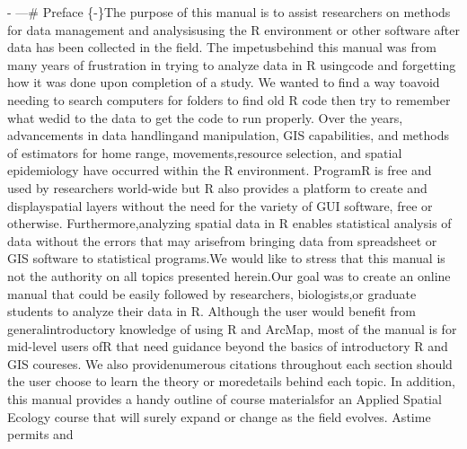 \documentclass[
  letterpaper,
  DIV=11,
  numbers=noendperiod]{scrreprt}
\begin{document}
- \posttitle{\end{center}}---\mainmatter\# Preface \{-\}The purpose of
this manual is to assist researchers on methods for data management and
analysisusing the R environment or other software after data has been
collected in the field. The impetusbehind this manual was from many
years of frustration in trying to analyze data in R usingcode and
forgetting how it was done upon completion of a study. We wanted to find
a way toavoid needing to search computers for folders to find old R code
then try to remember what wedid to the data to get the code to run
properly. Over the years, advancements in data handlingand manipulation,
GIS capabilities, and methods of estimators for home range,
movements,resource selection, and spatial epidemiology have occurred
within the R environment. ProgramR is free and used by researchers
world-wide but R also provides a platform to create and displayspatial
layers without the need for the variety of GUI software, free or
otherwise. Furthermore,analyzing spatial data in R enables statistical
analysis of data without the errors that may arisefrom bringing data
from spreadsheet or GIS software to statistical programs.We would like
to stress that this manual is not the authority on all topics presented
herein.Our goal was to create an online manual that could be easily
followed by researchers, biologists,or graduate students to analyze
their data in R. Although the user would benefit from
generalintroductory knowledge of using R and ArcMap, most of the manual
is for mid-level users ofR that need guidance beyond the basics of
introductory R and GIS coureses. We also providenumerous citations
throughout each section should the user choose to learn the theory or
moredetails behind each topic. In addition, this manual provides a handy
outline of course materialsfor an Applied Spatial Ecology course that
will surely expand or change as the field evolves. Astime permits and
\end{document}
